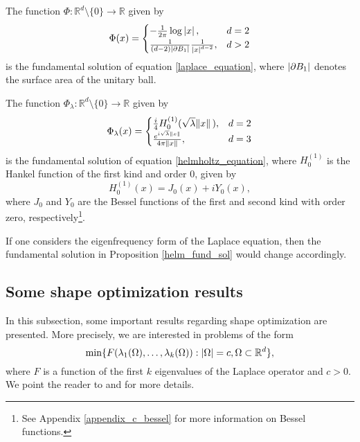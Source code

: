 \begin{proposition}
    The function \(\Phi: \mathbb{R}^d \setminus \{0\} \rightarrow \mathbb{R}\) given by
    \[
    \Phi(x) = \begin{cases}
        -\frac{1}{2 \pi} \log \abs*{x}, & d=2\\
        \frac{1}{(d-2)\abs{\partial B_1}}\frac{1}{\abs*{x}^{d-2}}, & d > 2
    \end{cases}    
    \]
    is the fundamental solution of equation \eqref{laplace_equation}, where \(\abs{\partial B_1}\) denotes the surface area of the unitary ball.
\end{proposition}
\begin{proposition}\label{helm_fund_sol}
    The function \(\Phi_\lambda: \mathbb{R}^d \setminus \{0\} \rightarrow \mathbb{R}\) given by
    \[
    \Phi_\lambda(x) = \begin{cases}
        \frac{i}{4} H_0^{(1)}(\sqrt{\lambda} \norm*{x}), & d=2\\
        \frac{e^{i \sqrt{\lambda} \norm*{x}}}{4 \pi \norm*{x}}, & d = 3
    \end{cases}    
    \]
    is the fundamental solution of equation \eqref{helmholtz_equation}, where \(H_0^{(1)}\) is the Hankel function of the first kind and order 0, given by
    \[
        H_0^{(1)}(x) = J_0(x) + i Y_0(x),
    \]
    where \(J_0\) and \(Y_0\) are the Bessel functions of the first and second kind with order zero, respectively\footnote{See Appendix \ref{appendix_c_bessel} for more information on Bessel functions.}.
\end{proposition}

If one considers the eigenfrequency form of the Laplace equation, then the fundamental solution in Proposition \ref{helm_fund_sol} would change accordingly.

\subsection{Some shape optimization results}

In this subsection, some important results regarding shape optimization are presented. More precisely, we are interested in problems of the form
\begin{equation}\label{shape_prob}
    \min\{F(\lambda_1(\Omega),\dots, \lambda_k(\Omega)): \abs{\Omega} = c, \Omega \subset \mathbb{R}^d\},
\end{equation}
where \(F\) is a function of the first \(k\) eigenvalues of the Laplace operator and \(c > 0\). We point the reader to \cite{henrot2006extremum} and \cite{henrot2017shape} for more details.

